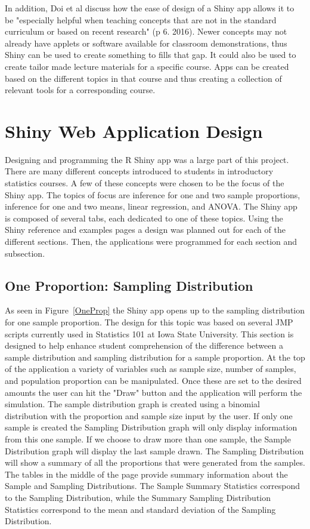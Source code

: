 \documentclass[11pt]{book}
\begin{document}
 In addition, Doi et al discuss how the ease of design of a Shiny app allows it to be "especially helpful when teaching concepts that are not in the standard curriculum or based on recent research" (p 6. 2016).  Newer concepts may not already have applets or software available for classroom demonstrations, thus Shiny can be used to create something to fills that gap.  It could also be used to create tailor made lecture materials for a specific course.  Apps can be created based on the different topics in that course and thus creating a collection of relevant tools for a corresponding course. 
 

\section{Shiny Web Application Design}
Designing and programming the R Shiny app was a large part of this project. There are many different concepts introduced to students in introductory statistics courses.  A few of these concepts were chosen to be the focus of the Shiny app.  The topics of focus are inference for one and two sample proportions, inference for one and two means, linear regression, and ANOVA.  The Shiny app is composed of several tabs, each dedicated to one of these topics. Using the Shiny reference and examples pages a design was planned out for each of the different sections. Then, the applications were programmed for each section and subsection. 


\subsection{One Proportion: Sampling Distribution}
As seen in Figure~\ref{OneProp} the Shiny app opens up to the sampling distribution for one sample proportion.  The design for this topic was based on several JMP scripts currently used in Statistics 101 at Iowa State University.  This section is designed to help enhance student comprehension of the difference between a sample distribution and sampling distribution for a sample proportion. At the top of the application a variety of variables such as sample size, number of samples, and population proportion can be manipulated.  Once these are set to the desired amounts the user can hit the "Draw" button and the application will perform the simulation. 
  The sample distribution graph is created using a binomial distribution with the proportion and sample size input by the user. If only one sample is created the Sampling Distribution graph will only display information from this one sample. If we choose to draw more than one sample, the Sample Distribution graph will display the last sample drawn. The Sampling Distribution will show a summary of all the proportions that were generated from the samples.  The tables in the middle of the page provide summary information about the Sample and Sampling Distributions. The Sample Summary Statistics correspond to the Sampling Distribution, while the  Summary Sampling Distribution Statistics correspond to the mean and standard deviation of the Sampling Distribution. 
\end{document}
